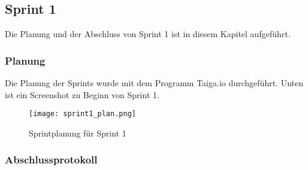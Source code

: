 \subsection*{Sprint 1}
Die Planung und der Abschluss von Sprint 1 ist in diesem Kapitel aufgeführt.
\subsubsection*{Planung}
Die Planung der Sprints wurde mit dem Programm Taiga.io durchgeführt. Unten ist ein Screenshot zu Beginn von Sprint 1.
    \begin{figure}[H]
        \centering
        \texttt{[image: sprint1\_plan.png]}
        \caption{Sprintplanung für Sprint 1}
    \end{figure}
\subsubsection*{Abschlussprotokoll}